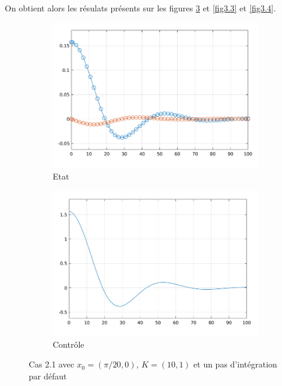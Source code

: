 \documentclass[a4paper]{article}
\begin{document}
                        On obtient alors les résulats présents sur les figures \ref{fig3.2} et \ref{fig3.3} et \ref{fig3.4}.
                        \begin{figure}[h!]
                                \centering
                                \begin{subfigure}[b]{0.45\textwidth}
                                        \includegraphics[width=\textwidth]{images/courbe_cas_2_1_TP02.png}
                                        \caption{Etat}
                                        \label{fig3.2.1}
                                \end{subfigure}
                                \hspace{30pt}
                                \begin{subfigure}[b]{0.45\textwidth}
                                        \includegraphics[width=\textwidth]{images/controle_cas_2_1_TP02.png}
                                        \caption{Contrôle}
                                        \label{fig3.2.2}
                                \end{subfigure}
                                \caption{Cas 2.1 avec $x_0=(\pi/20, 0)$, $K=(10,1)$ et un pas d'intégration par défaut}
                                \label{fig3.2}
                        \end{figure}
\end{document}
